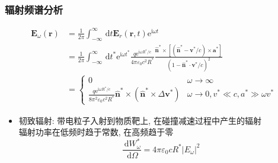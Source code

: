 \documentclass[12pt,a4paper]{article}%
\numberwithin{equation}{section}%
\renewcommand*{\vec}[1]{\bm{#1}}%
\newcommand{\dif}{\,\mathrm d}
\newcommand\mi{\mathrm{i}}
\newcommand\e{\mathrm{e}}%
\newcommand*{\uvec}[1]{\hat{\vec{#1}}}
\begin{document}
\subsubsection{辐射频谱分析} %
\label{ssub:spectral_analysis}
\begin{align}
    \vec E_\omega(\vec r) &= \frac1{2\pi}\int_{-\infty}^{\infty}\dif t\vec E_r(\vec r, t)\e^{\mi\omega t} \\
    &= \frac 1{2\pi}\int_{-\infty}^\infty\dif t^*\e^{\mi\omega t^*} \frac{q\e^{\mi\omega R^*/c}}{4\pi\varepsilon_0 c^2 R^*}\frac{\uvec n^*\times \left[(\uvec n^* - \vec v^*/c)\times\vec a^*\right]}{(1-\uvec n^*\cdot\vec v^*/c)^2} \\
    &=\begin{cases}
        0 & \omega\to\infty \\
        \frac{q\e^{\mi\omega R^*/c}}{8\pi^2\varepsilon_0 c^2 R^*}\uvec n^*\times(\uvec n^*\times\Delta \vec v^*) &\omega\to 0, v^*\ll c, a^* \gg \omega v^*
    \end{cases}
\end{align}
\begin{itemize}
    \item 韧致辐射: 带电粒子入射到物质靶上, 在碰撞减速过程中产生的辐射\\
    辐射功率在低频时趋于常数, 在高频趋于零
    \begin{equation}
        \frac{\dif W_\omega^*}{\dif\Omega} = 4\pi\varepsilon_0cR^*|E_\omega|^2
    \end{equation}
\end{itemize}
\end{document}
